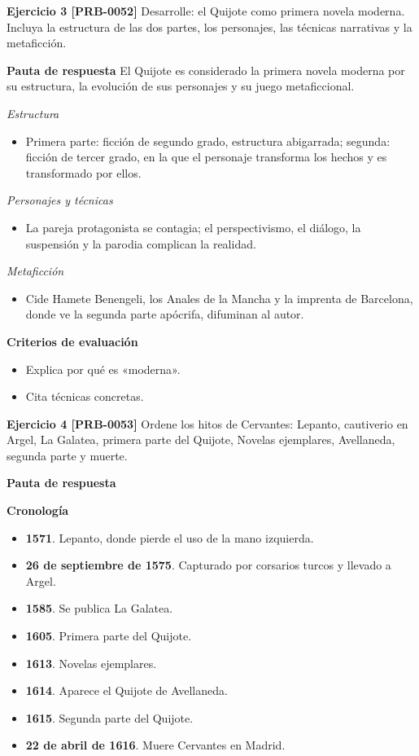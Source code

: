 \documentclass{book}
\begin{document}
\noindent\textbf{Ejercicio 3 [PRB-0052]}
Desarrolle: el Quijote como primera novela moderna. Incluya la estructura de las dos partes, los personajes, las técnicas narrativas y la metaficción.


\noindent\textbf{Pauta de respuesta}
El Quijote es considerado la primera novela moderna por su estructura, la evolución de sus personajes y su juego metaficcional.


\noindent\textit{Estructura}
\begin{itemize}
\item Primera parte: ficción de segundo grado, estructura abigarrada; segunda: ficción de tercer grado, en la que el personaje transforma los hechos y es transformado por ellos.
\end{itemize}

\noindent\textit{Personajes y técnicas}
\begin{itemize}
\item La pareja protagonista se contagia; el perspectivismo, el diálogo, la suspensión y la parodia complican la realidad.
\end{itemize}

\noindent\textit{Metaficción}
\begin{itemize}
\item Cide Hamete Benengeli, los Anales de la Mancha y la imprenta de Barcelona, donde ve la segunda parte apócrifa, difuminan al autor.
\end{itemize}

\noindent\textbf{Criterios de evaluación}
\begin{itemize}
\item Explica por qué es «moderna».
\item Cita técnicas concretas.
\end{itemize}

\noindent\textbf{Ejercicio 4 [PRB-0053]}
Ordene los hitos de Cervantes: Lepanto, cautiverio en Argel, La Galatea, primera parte del Quijote, Novelas ejemplares, Avellaneda, segunda parte y muerte.


\noindent\textbf{Pauta de respuesta}

\noindent\textbf{Cronología}
\begin{itemize}
\item \textbf{1571}. Lepanto, donde pierde el uso de la mano izquierda.
\item \textbf{26 de septiembre de 1575}. Capturado por corsarios turcos y llevado a Argel.
\item \textbf{1585}. Se publica La Galatea.
\item \textbf{1605}. Primera parte del Quijote.
\item \textbf{1613}. Novelas ejemplares.
\item \textbf{1614}. Aparece el Quijote de Avellaneda.
\item \textbf{1615}. Segunda parte del Quijote.
\item \textbf{22 de abril de 1616}. Muere Cervantes en Madrid.
\end{itemize}
\end{document}
